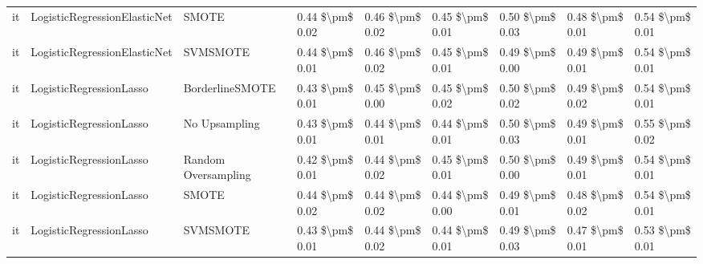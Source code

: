 \begin{tabular}{lllllllll}
      it &    LogisticRegressionElasticNet &                         SMOTE & 0.44 \$\textbackslash pm\$ 0.02 &           0.46 \$\textbackslash pm\$ 0.02 &       0.45 \$\textbackslash pm\$ 0.01 &        0.50 \$\textbackslash pm\$ 0.03 &                         0.48 \$\textbackslash pm\$ 0.01 &     0.54 \$\textbackslash pm\$ 0.01 \\
      it &    LogisticRegressionElasticNet &                      SVMSMOTE & 0.44 \$\textbackslash pm\$ 0.01 &           0.46 \$\textbackslash pm\$ 0.02 &       0.45 \$\textbackslash pm\$ 0.01 &        0.49 \$\textbackslash pm\$ 0.00 &                         0.49 \$\textbackslash pm\$ 0.01 &     0.54 \$\textbackslash pm\$ 0.01 \\
      it &         LogisticRegressionLasso &               BorderlineSMOTE & 0.43 \$\textbackslash pm\$ 0.01 &           0.45 \$\textbackslash pm\$ 0.00 &       0.45 \$\textbackslash pm\$ 0.02 &        0.50 \$\textbackslash pm\$ 0.02 &                         0.49 \$\textbackslash pm\$ 0.02 &     0.54 \$\textbackslash pm\$ 0.01 \\
      it &         LogisticRegressionLasso &                 No Upsampling & 0.43 \$\textbackslash pm\$ 0.01 &           0.44 \$\textbackslash pm\$ 0.01 &       0.44 \$\textbackslash pm\$ 0.01 &        0.50 \$\textbackslash pm\$ 0.03 &                         0.49 \$\textbackslash pm\$ 0.01 &     0.55 \$\textbackslash pm\$ 0.02 \\
      it &         LogisticRegressionLasso &           Random Oversampling & 0.42 \$\textbackslash pm\$ 0.01 &           0.44 \$\textbackslash pm\$ 0.02 &       0.45 \$\textbackslash pm\$ 0.01 &        0.50 \$\textbackslash pm\$ 0.00 &                         0.49 \$\textbackslash pm\$ 0.01 &     0.54 \$\textbackslash pm\$ 0.01 \\
      it &         LogisticRegressionLasso &                         SMOTE & 0.44 \$\textbackslash pm\$ 0.02 &           0.44 \$\textbackslash pm\$ 0.02 &       0.44 \$\textbackslash pm\$ 0.00 &        0.49 \$\textbackslash pm\$ 0.01 &                         0.48 \$\textbackslash pm\$ 0.02 &     0.54 \$\textbackslash pm\$ 0.01 \\
      it &         LogisticRegressionLasso &                      SVMSMOTE & 0.43 \$\textbackslash pm\$ 0.01 &           0.44 \$\textbackslash pm\$ 0.02 &       0.44 \$\textbackslash pm\$ 0.01 &        0.49 \$\textbackslash pm\$ 0.03 &                         0.47 \$\textbackslash pm\$ 0.01 &     0.53 \$\textbackslash pm\$ 0.01 \\

\end{tabular}
